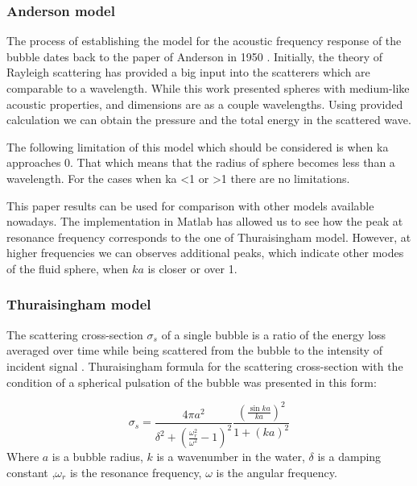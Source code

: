 \subsubsection{Anderson model}
The process of establishing the model for the acoustic frequency response of the bubble dates back to the paper of Anderson in 1950 \cite{anderson_sound_2005}. Initially, the theory of Rayleigh scattering has provided a big input into the scatterers which are comparable to a wavelength. While this work presented spheres with medium-like acoustic properties, and dimensions are as a couple  wavelengths. Using provided calculation we can obtain the pressure and the total energy in the scattered wave.

The following limitation of this model which should be considered is when ka approaches 0. That which means that the radius of sphere becomes less than a wavelength. For the cases when ka <1 or >1 there are no limitations.

This paper results can be used for comparison with other models available nowadays. The implementation in Matlab has allowed us to see how the peak at resonance frequency corresponds to the one of Thuraisingham model. However, at higher frequencies we can observes additional peaks, which indicate other modes of the fluid sphere, when $ka$ is closer or over 1.

\subsubsection{Thuraisingham model}
The scattering cross-section $\sigma_s$ of a single bubble is a ratio of the energy loss averaged over time while being scattered from the bubble to the intensity of incident signal \cite[p.408]{thuraisingham_new_1997}. Thuraisingham formula for the scattering cross-section with the condition of a spherical pulsation of the bubble was presented in this form: 

\begin{equation}\label{eq:thuraisingham}
    \sigma_s=\frac{4\pi a^2}{\delta^2 + (\frac{\omega_r^2}{\omega^2}-1)^2}\frac{(\frac{\sin ka}{ka})^2}{1+(ka)^2}
\end{equation}
Where $a$ is a bubble radius, $k$ is a wavenumber in the water, $\delta$ is a damping constant ,$\omega_r$  is the resonance frequency, $\omega$  is the angular frequency.

